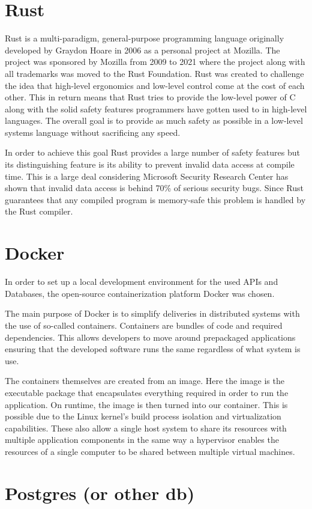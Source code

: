 \section{Rust}
Rust is a multi-paradigm, general-purpose programming language originally developed by Graydon Hoare in 2006 as a personal project at Mozilla. 
The project was sponsored by Mozilla from 2009 to 2021 where the project along with all trademarks was moved to the Rust Foundation. 
Rust was created to challenge the idea that high-level ergonomics and low-level control come at the cost of each other\cite{Rust_Book}. 
This in return means that Rust tries to provide the low-level power of C along with the solid safety features programmers have gotten used to in high-level languages. 
The overall goal is to provide as much safety as possible in a low-level systems language without sacrificing any speed\cite{Rust_in_Action}. 

In order to achieve this goal Rust provides a large number of safety features but its distinguishing feature is its ability to prevent invalid data access at compile time. 
This is a large deal considering Microsoft Security Research Center has shown that invalid data access is behind 70\% of serious security bugs\cite{Safe_Systems_Languages}. 
Since Rust guarantees that any compiled program is memory-safe this problem is handled by the Rust compiler.


\section{Docker}
In order to set up a local development environment for the used APIs and Databases, the open-source containerization platform Docker was chosen. 

The main purpose of Docker is to simplify deliveries in distributed systems with the use of so-called containers\cite{Docker_Container}.
Containers are bundles of code and required dependencies. This allows developers to move around prepackaged applications ensuring that the developed software runs the same regardless of what system is use\cite{Docker_Container}.

The containers themselves are created from an image. Here the image is the executable package that encapsulates everything required in order to run the application. On runtime, the image is then turned into our container. 
This is possible due to the Linux kernel's build process isolation and virtualization capabilities. These also allow a single host system to share its resources with multiple application components in the same way a hypervisor enables the resources of a single computer to be shared between multiple virtual machines\cite{Docker_Container}.


\section{Postgres (or other db)} %

